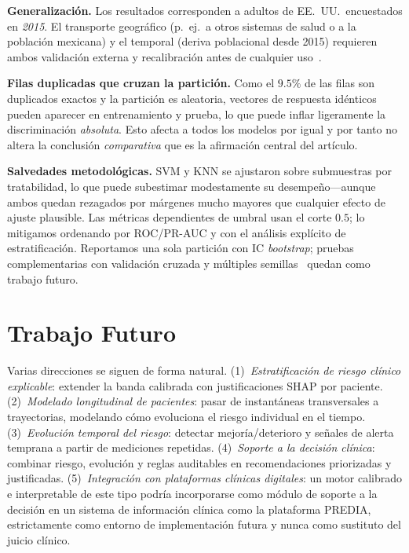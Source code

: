 \documentclass[conference]{IEEEtran}
\begin{document}
\textbf{Generalización.} Los resultados corresponden a adultos de EE.\ UU.\ encuestados en
\emph{2015}. El transporte geográfico (p.\ ej.\ a otros sistemas de salud o a la población
mexicana) y el temporal (deriva poblacional desde 2015) requieren ambos validación externa y
recalibración antes de cualquier uso~\cite{vancalster2019calibration,collins2024tripod}.

\textbf{Filas duplicadas que cruzan la partición.} Como el $9.5\%$ de las filas son
duplicados exactos y la partición es aleatoria, vectores de respuesta idénticos pueden
aparecer en entrenamiento y prueba, lo que puede inflar ligeramente la discriminación
\emph{absoluta}. Esto afecta a todos los modelos por igual y por tanto no altera la
conclusión \emph{comparativa} que es la afirmación central del artículo.

\textbf{Salvedades metodológicas.} SVM y KNN se ajustaron sobre submuestras por tratabilidad,
lo que puede subestimar modestamente su desempeño---aunque ambos quedan rezagados por
márgenes mucho mayores que cualquier efecto de ajuste plausible. Las métricas dependientes de
umbral usan el corte $0.5$; lo mitigamos ordenando por ROC/PR-AUC y con el análisis explícito
de estratificación. Reportamos una sola partición con IC \emph{bootstrap}; pruebas
complementarias con validación cruzada y múltiples
semillas~\cite{demsar2006statistical} quedan como trabajo futuro.

\section{Trabajo Futuro}
Varias direcciones se siguen de forma natural. (1)~\emph{Estratificación de riesgo clínico
explicable}: extender la banda calibrada con justificaciones SHAP por paciente.
(2)~\emph{Modelado longitudinal de pacientes}: pasar de instantáneas transversales a
trayectorias, modelando cómo evoluciona el riesgo individual en el tiempo. (3)~\emph{Evolución
temporal del riesgo}: detectar mejoría/deterioro y señales de alerta temprana a partir de
mediciones repetidas. (4)~\emph{Soporte a la decisión clínica}: combinar riesgo, evolución y
reglas auditables en recomendaciones priorizadas y justificadas. (5)~\emph{Integración con
plataformas clínicas digitales}: un motor calibrado e interpretable de este tipo podría
incorporarse como módulo de soporte a la decisión en un sistema de información clínica como la
plataforma PREDIA, estrictamente como entorno de implementación futura y nunca como sustituto
del juicio clínico.
\end{document}
